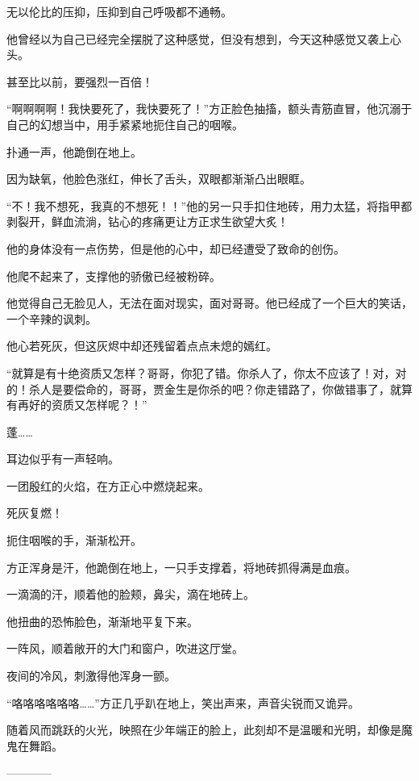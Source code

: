 \begin{this_body}
无以伦比的压抑，压抑到自己呼吸都不通畅。

他曾经以为自己已经完全摆脱了这种感觉，但没有想到，今天这种感觉又袭上心头。

甚至比以前，要强烈一百倍！

“啊啊啊啊！我快要死了，我快要死了！”方正脸色抽搐，额头青筋直冒，他沉溺于自己的幻想当中，用手紧紧地扼住自己的咽喉。

扑通一声，他跪倒在地上。

因为缺氧，他脸色涨红，伸长了舌头，双眼都渐渐凸出眼眶。

“不！我不想死，我真的不想死！！”他的另一只手扣住地砖，用力太猛，将指甲都剥裂开，鲜血流淌，钻心的疼痛更让方正求生欲望大炙！

他的身体没有一点伤势，但是他的心中，却已经遭受了致命的创伤。

他爬不起来了，支撑他的骄傲已经被粉碎。

他觉得自己无脸见人，无法在面对现实，面对哥哥。他已经成了一个巨大的笑话，一个辛辣的讽刺。

他心若死灰，但这灰烬中却还残留着点点未熄的嫣红。

“就算是有十绝资质又怎样？哥哥，你犯了错。你杀人了，你太不应该了！对，对的！杀人是要偿命的，哥哥，贾金生是你杀的吧？你走错路了，你做错事了，就算有再好的资质又怎样呢？！”

蓬……

耳边似乎有一声轻响。

一团殷红的火焰，在方正心中燃烧起来。

死灰复燃！

扼住咽喉的手，渐渐松开。

方正浑身是汗，他跪倒在地上，一只手支撑着，将地砖抓得满是血痕。

一滴滴的汗，顺着他的脸颊，鼻尖，滴在地砖上。

他扭曲的恐怖脸色，渐渐地平复下来。

一阵风，顺着敞开的大门和窗户，吹进这厅堂。

夜间的冷风，刺激得他浑身一颤。

“咯咯咯咯咯咯……”方正几乎趴在地上，笑出声来，声音尖锐而又诡异。

随着风而跳跃的火光，映照在少年端正的脸上，此刻却不是温暖和光明，却像是魔鬼在舞蹈。

------------

\end{this_body}

